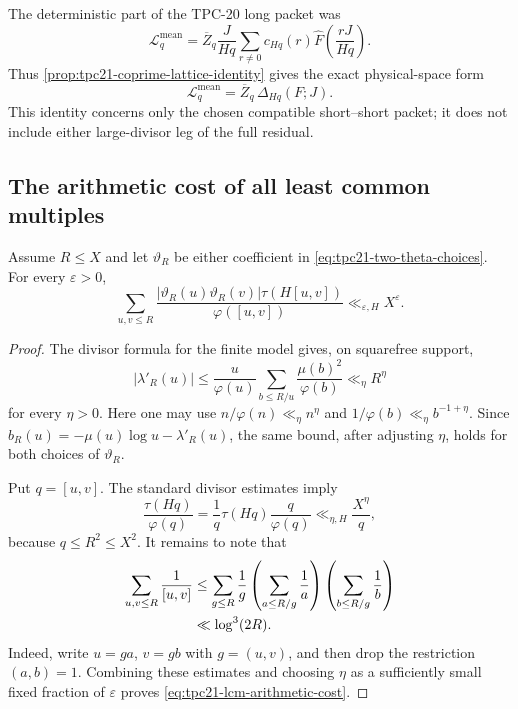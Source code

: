 The deterministic part of the TPC-20 long packet was
\[
 \mathcal L_q^{\mathrm{mean}}
 =\overline Z_q\frac{J}{Hq}
 \sum_{r\ne0}c_{Hq}(r)
 \widehat F\!\left(\frac{rJ}{Hq}\right).
\]
Thus \cref{prop:tpc21-coprime-lattice-identity} gives the exact
physical-space form
\begin{equation}
 \boxed{
 \mathcal L_q^{\mathrm{mean}}
 =\overline Z_q\,\Delta_{Hq}(F;J).}
 \label{eq:tpc21-mean-packet-physical-form}
\end{equation}
This identity concerns only the chosen compatible short--short packet;
it does not include either large-divisor leg of the full residual.

\subsection{The arithmetic cost of all least common multiples}

\begin{lemma}
\label{lem:tpc21-lcm-arithmetic-cost}
Assume \(R\le X\) and let \(\vartheta_R\) be either coefficient in
\eqref{eq:tpc21-two-theta-choices}.  For every \(\varepsilon>0\),
\begin{equation}
 \boxed{
 \sum_{u,v\le R}
 \frac{|\vartheta_R(u)\vartheta_R(v)|
       \tau(H[u,v])}{\varphi([u,v])}
 \ll_{\varepsilon,H}X^\varepsilon.}
 \label{eq:tpc21-lcm-arithmetic-cost}
\end{equation}
\end{lemma}

\begin{proof}
The divisor formula for the finite model gives, on squarefree support,
\[
 |\lambda'_R(u)|
 \le \frac u{\varphi(u)}
 \sum_{b\le R/u}\frac{\mu(b)^2}{\varphi(b)}
 \ll_\eta R^\eta
\]
for every \(\eta>0\).  Here one may use
\(n/\varphi(n)\ll_\eta n^\eta\) and
\(1/\varphi(b)\ll_\eta b^{-1+\eta}\).
Since
\(b_R(u)=-\mu(u)\log u-\lambda'_R(u)\), the same bound, after
adjusting \(\eta\), holds for both choices of \(\vartheta_R\).

Put \(q=[u,v]\).  The standard divisor estimates imply
\[
 \frac{\tau(Hq)}{\varphi(q)}
 =\frac1q\tau(Hq)\frac q{\varphi(q)}
 \ll_{\eta,H}\frac{X^\eta}{q},
\]
because \(q\le R^2\le X^2\).  It remains to note that
\begin{align}
 \sum_{u,v\le R}\frac1{[u,v]}
 &\le
 \sum_{g\le R}\frac1g
 \left(\sum_{a\le R/g}\frac1a\right)
 \left(\sum_{b\le R/g}\frac1b\right)
 \notag\\
 &\ll \log^3(2R).
 \label{eq:tpc21-reciprocal-lcm-sum}
\end{align}
Indeed, write \(u=ga\), \(v=gb\) with \(g=(u,v)\), and then drop
the restriction \((a,b)=1\).  Combining these estimates and choosing
\(\eta\) as a sufficiently small fixed fraction of \(\varepsilon\)
proves \eqref{eq:tpc21-lcm-arithmetic-cost}.
\end{proof}

